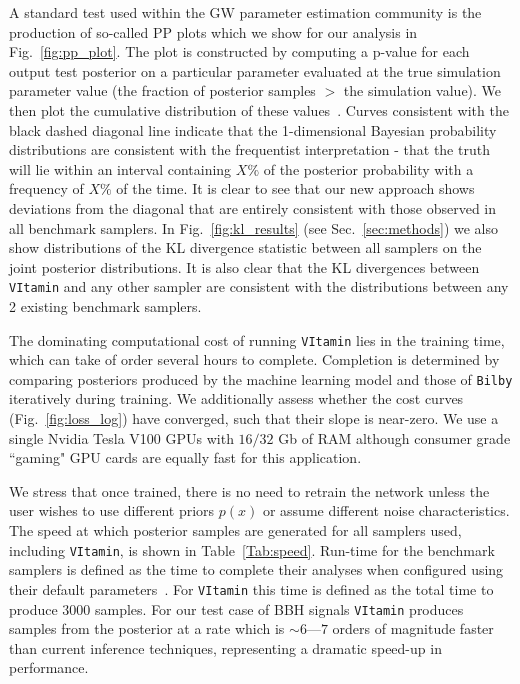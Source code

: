 \documentclass[%
showpacs,
 amsmath,amssymb,
 aps,
 twocolumn,
 prl,
 reprint,
floatfix,
]{revtex4-1}
\newcommand{\chris}[1]{\textbf{\textcolor{red}{CHRIS: #1}}}
\begin{document}
%
%
A standard test used within the \ac{GW} parameter estimation community is the
production of so-called \ac{PP} plots which we show for our analysis in
Fig.~\ref{fig:pp_plot}. The plot is constructed by computing a p-value for each
output test posterior on a particular parameter evaluated at the true
simulation parameter value (the fraction of posterior samples $>$ the
simulation value). We then plot the cumulative distribution of these
values~\cite{1409.7215}. Curves consistent with the black dashed diagonal line
indicate that the 1-dimensional Bayesian probability distributions are
consistent with the frequentist interpretation - that the truth will lie within
an interval containing $X\%$ of the posterior probability with a frequency of
$X\%$ of the time. It is clear to see that our new approach shows deviations
from the diagonal that are entirely consistent with those observed in all
benchmark samplers. In Fig.~\ref{fig:kl_results} (see Sec.~\ref{sec:methods})
we also show distributions of the \ac{KL} divergence statistic between all
samplers on the joint posterior distributions. It is also clear that the
\ac{KL} divergences between \texttt{VItamin} and any other sampler are
consistent with the distributions between any 2 existing benchmark samplers.      

%
%
The dominating computational cost of running \texttt{VItamin} lies in the
training time, which can take of order several hours to complete.  Completion
is determined by comparing posteriors produced by the machine learning model
and those of \texttt{Bilby} iteratively during training. We additionally assess
whether the cost curves (Fig.~\ref{fig:loss_log}) have converged, such that 
their slope is near-zero. We use a 
single Nvidia Tesla V100 \acp{GPU} with $16/32$ Gb of RAM although consumer grade
``gaming" \ac{GPU} cards are equally fast for this application. 

We stress that
once trained, there is no need to retrain the network unless the user wishes to
use different priors $p(x)$ or assume different noise characteristics.   The
speed at which posterior samples are generated for all samplers used, including
\texttt{VItamin}, is shown in Table~\ref{Tab:speed}. Run-time for the benchmark
samplers is defined as the time to complete their analyses when configured
using their default parameters~\cite{1811.02042}. For \texttt{VItamin} this
time is defined as the total time to produce $3000$ samples. For our test case
of \ac{BBH} signals \texttt{VItamin} produces samples from the posterior at a
rate which is $\sim 6$---$7$ orders of magnitude faster than current inference
techniques, representing a dramatic speed-up in performance. 
\end{document}
